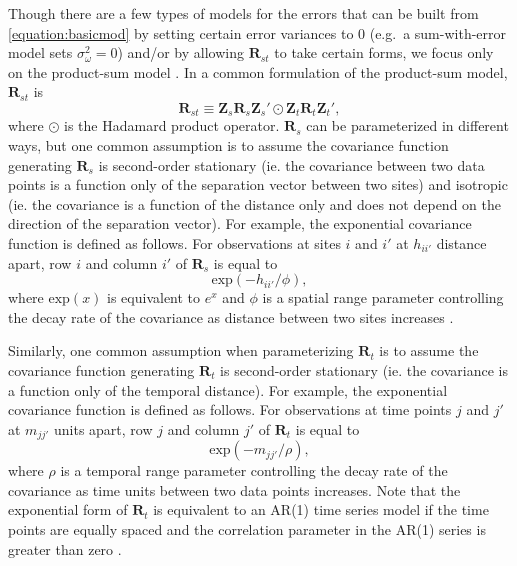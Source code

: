 \documentclass[]{interact}
\theoremstyle{plain}%
\theoremstyle{definition}
\theoremstyle{remark}
\begin{document}
Though there are a few types of models for the errors that can be built
from \ref{equation:basicmod} by setting certain error variances to 0
(e.g.~a sum-with-error model sets \(\sigma^2_{\omega} = 0\)) and/or by
allowing \(\mathbf{R}_{st}\) to take certain forms, we focus only on the
product-sum model \citep{de2001product, de2001space}. In a common
formulation of the product-sum model, \(\mathbf{R}_{st}\) is \mbox{}
\begin{equation*}
\mathbf{R}_{st} \equiv \mathbf{Z}_{s} \mathbf{R}_{s} \mathbf{Z}_{s}' \odot \mathbf{Z}_t \mathbf{R}_t \mathbf{Z}_t',
\end{equation*} \noindent where \(\odot\) is the Hadamard product
operator. \(\mathbf{R}_s\) can be parameterized in different ways, but
one common assumption is to assume the covariance function generating
\(\mathbf{R}_s\) is second-order stationary (ie. the covariance between
two data points is a function only of the separation vector between two
sites) and isotropic (ie. the covariance is a function of the distance
only and does not depend on the direction of the separation vector). For
example, the exponential covariance function is defined as follows. For
observations at sites \(i\) and \(i'\) at \(h_{ii'}\) distance apart,
row \(i\) and column \(i'\) of \(\mathbf{R}_{s}\) is equal to \mbox{}
\begin{equation}
\label{equation:spatcov}
\text{exp}(-h_{ii'} / \phi),
\end{equation} \noindent where \(\text{exp}(x)\) is equivalent to
\(e^x\) and \(\phi\) is a spatial range parameter controlling the decay
rate of the covariance as distance between two sites increases
\citep{cressie2015statistics}.

Similarly, one common assumption when parameterizing \(\mathbf{R}_t\) is
to assume the covariance function generating \(\mathbf{R}_t\) is
second-order stationary (ie. the covariance is a function only of the
temporal distance). For example, the exponential covariance function is
defined as follows. For observations at time points \(j\) and \(j'\) at
\(m_{jj'}\) units apart, row \(j\) and column \(j'\) of
\(\mathbf{R}_{t}\) is equal to \mbox{} \begin{equation}
\label{equation:tempcov}
\text{exp}(-m_{jj'} / \rho),
\end{equation} \noindent where \(\rho\) is a temporal range parameter
controlling the decay rate of the covariance as time units between two
data points increases. Note that the exponential form of
\(\mathbf{R}_t\) is equivalent to an AR(1) time series model if the time
points are equally spaced and the correlation parameter in the AR(1)
series is greater than zero \citep{schabenberger2017statistical}.
\end{document}
